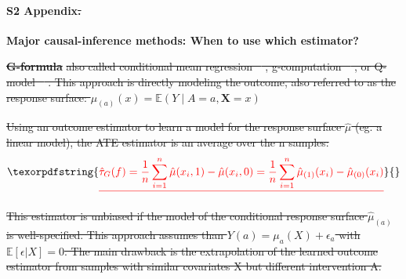 \documentclass[10pt,letterpaper]{article}
\providecommand{\DIFdeltex}[1]{{\protect\color{red}\sout{#1}}}                      %
\providecommand{\DIFdelbegin}{} %
\providecommand{\DIFdelend}{} %
\providecommand{\DIFdel}[1]{\texorpdfstring{\DIFdeltex{#1}}{}} %
\newcommand{\DIFscaledelfig}{0.5}
\newlength{\DIFdelgraphicswidth} %
\newlength{\DIFdelgraphicsheight} %
\newcommand{\DIFdelincludegraphics}[2][]{%
\sbox{\DIFdelgraphicsbox}{\DIFOincludegraphics[#1]{#2}}%
\settoboxwidth{\DIFdelgraphicswidth}{\DIFdelgraphicsbox} %
\settoboxtotalheight{\DIFdelgraphicsheight}{\DIFdelgraphicsbox} %
\scalebox{\DIFscaledelfig}{%
\parbox[b]{\DIFdelgraphicswidth}{\usebox{\DIFdelgraphicsbox}\\[-\baselineskip] \rule{\DIFdelgraphicswidth}{0em}}\llap{\resizebox{\DIFdelgraphicswidth}{\DIFdelgraphicsheight}{%
\setlength{\unitlength}{\DIFdelgraphicswidth}%
\begin{picture}(1,1)%
\thicklines\linethickness{2pt} %
{\color[rgb]{1,0,0}\put(0,0){\framebox(1,1){}}}%
{\color[rgb]{1,0,0}\put(0,0){\line( 1,1){1}}}%
{\color[rgb]{1,0,0}\put(0,1){\line(1,-1){1}}}%
\end{picture}%
}\hspace*{3pt}}} %
} %
\DeclareRobustCommand{\DIFdelbegin}{\DIFOdelbegin \let\includegraphics\DIFdelincludegraphics} %
\DeclareRobustCommand{\DIFdelend}{\DIFOaddend \let\includegraphics\DIFOincludegraphics} %
\begin{document}
\DIFdelend \paragraph*{S2 Appendix\DIFdelbegin \DIFdel{.}\DIFdelend }
\label{apd:causal_estimators}
{\bf Major causal-inference methods: When to use which estimator?}

\DIFdelbegin \textbf{\DIFdel{G-formula}} %
\DIFdel{also called conditional mean regression
  \mbox{%
    \cite{wendling2018comparing}}\hskip0pt%
  , g-computation \mbox{%
    \cite{robins1986role}}\hskip0pt%
  , or
  Q-model \mbox{%
    \cite{snowden2011implementation}}\hskip0pt%
  . This approach is directly modeling
  the outcome, also referred to as the response surface: $\mu_{(a)}(x)
    =\mathbb{E}\left(Y \mid A=a, \mathbf{X}=x\right)$
}%

\DIFdel{Using an outcome estimator to learn a model for the response surface $\hat
    \mu$ (eg. a linear model), the ATE estimator is an average over the n samples:
}\begin{displaymath}
  \DIFdel{\hat{\tau}_G(f) = \frac{1}{n} \sum_{i=1}^n \hat \mu(x_i, 1) - \hat \mu(x_i, 0) = \frac{1}{n} \sum_{i=1}^n \hat \mu_{(1)}(x_i) - \hat \mu_{(0)}(x_i)
  }\end{displaymath}%

\DIFdel{This estimator is unbiased if the model of the conditional response surface
  $\hat \mu_{(a)}$ is well-specified. This approach assumes than $Y(a) =
    \mu_a(X) + \epsilon_a$ with $\mathbb E[\epsilon|X] = 0$. The main drawback is
  the extrapolation of the learned outcome estimator from samples with similar
  covariates X but different intervention A.}%
\end{document}
